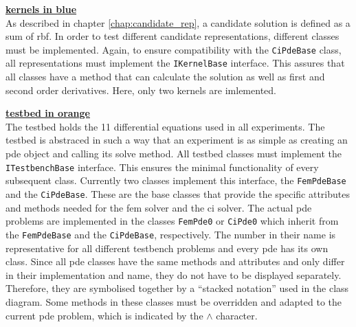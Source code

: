 \documentclass[./\jobname.tex]{subfiles}
\begin{document}
\textcolor{kernels_colour}{\large \underline{\textbf{kernels in blue}}} \\
As described in chapter \ref{chap:candidate_rep}, a candidate solution is defined as a sum of \gls{rbf}. In order to test different candidate representations, different classes must be implemented. Again, to ensure compatibility with the \colorbox{light-gray}{\lstinline[basicstyle=\ttfamily\color{black}]|CiPdeBase|} class, all representations must implement the \colorbox{light-gray}{\lstinline[basicstyle=\ttfamily\color{black}]|IKernelBase|} interface. This assures that all classes have a method that can calculate the solution as well as first and second order derivatives. Here, only two kernels are imlemented.

\textcolor{testbed_colour}{\large \underline{\textbf{testbed in orange}}} \\
The testbed holds the 11 differential equations used in all experiments. The testbed is abstraced in such a way that an experiment is as simple as creating an \gls{pde} object and calling its solve method. All testbed classes must implement the \colorbox{light-gray}{\lstinline[basicstyle=\ttfamily\color{black}]|ITestbenchBase|} interface. This ensures the minimal functionality of every subsequent class. Currently two classes implement this interface, the \colorbox{light-gray}{\lstinline[basicstyle=\ttfamily\color{black}]|FemPdeBase|} and the \colorbox{light-gray}{\lstinline[basicstyle=\ttfamily\color{black}]|CiPdeBase|}. These are the base classes that provide the specific attributes and methods needed for the \gls{fem} solver and the \gls{ci} solver. The actual \gls{pde} problems are implemented in the classes \colorbox{light-gray}{\lstinline[basicstyle=\ttfamily\color{black}]|FemPde0|} or \colorbox{light-gray}{\lstinline[basicstyle=\ttfamily\color{black}]|CiPde0|} which inherit from the \colorbox{light-gray}{\lstinline[basicstyle=\ttfamily\color{black}]|FemPdeBase|} and the \colorbox{light-gray}{\lstinline[basicstyle=\ttfamily\color{black}]|CiPdeBase|}, respectively. The number in their name is representative for all different testbench problems and every \gls{pde} has its own class. Since all \gls{pde} classes have the same methods and attributes and only differ in their implementation and name, they do not have to be displayed separately. Therefore, they are symbolised together by a ``stacked notation'' used in the class diagram. Some methods in these classes must be overridden and adapted to the current \gls{pde} problem, which is indicated by the $\land$ character.
\end{document}
